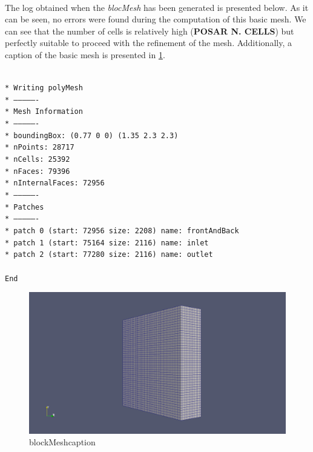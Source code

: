 \paragraph{}The log obtained when the \textit{blocMesh} has been generated is presented below. As it can be seen, no errors were found during the computation of this basic mesh. We can see that the number of cells is relatively high (\textbf{POSAR N. CELLS}) but perfectly suitable to proceed with the refinement of the mesh. Additionally, a caption of the basic mesh is presented in \ref{blockMeshcaption}.

\texttt{\\*
Writing polyMesh\\*
----------------\\*
Mesh Information\\*
----------------\\*
  boundingBox: (0.77 0 0) (1.35 2.3 2.3)\\*
  nPoints: 28717\\*
  nCells: 25392\\*
  nFaces: 79396\\*
  nInternalFaces: 72956\\*
----------------\\*
Patches\\*
----------------\\*
  patch 0 (start: 72956 size: 2208) name: frontAndBack\\*
  patch 1 (start: 75164 size: 2116) name: inlet\\*
  patch 2 (start: 77280 size: 2116) name: outlet\\
  \\
  End
}

\begin{figure}[h!]
\includegraphics[scale=0.26]{./mesh/screenshots/blockmesh}
\centering
\caption{blockMeshcaption}
\label{blockMeshcaption}
\end{figure}

